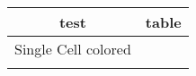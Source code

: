 \begin{tabular}{*{1}{|c}|c|}
\hline
 test & table \\
 \hline
 Single Cell colored &  \\
   \\
\hline
\end{tabular}
